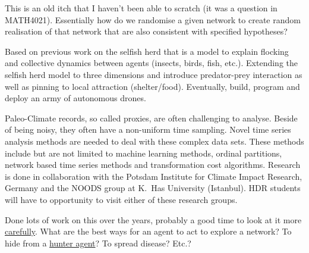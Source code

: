 \documentclass[10pt,a4paper]{Projects}
\begin{document}
This is an old itch that I haven’t been able to scratch (it was a question in MATH4021). Essentially how do we randomise a given network to create random realisation of that network that are also consistent with specified hypotheses? 
 
Based on previous work on the selfish herd that is a model to explain flocking and collective dynamics between agents (insects, birds, fish, etc.). Extending the selfish herd model to three dimensions and introduce predator-prey interaction as well as pinning to local attraction (shelter/food). Eventually, build, program and deploy an army of autonomous drones.

Paleo-Climate records, so called proxies, are often challenging to analyse. Beside of being noisy, they often have a non-uniform time sampling. Novel time series analysis methods are needed to deal with these complex data sets. These methods include but are not limited to machine learning methods, ordinal partitions, network based time series methods and transformation cost algorithms. Research is done in collaboration with the Potsdam Institute for Climate Impact Research, Germany and the NOODS group at K.~Has University (Istanbul). HDR students will have to opportunity to visit either of these research groups. 

Done lots of work on this over the years, probably a good time to look at it more \href{https://research-repository.uwa.edu.au/en/publications/an-exploration-and-simulation-of-epidemic-spread-and-its-control-}{carefully}. What are the best ways for an agent to act to explore a network? To hide from a \href{https://research-repository.uwa.edu.au/en/publications/predicting-search-time-when-hunting-for-multiple-moving-targets-a}{hunter agent}? To spread disease? Etc.? 
\end{document}
